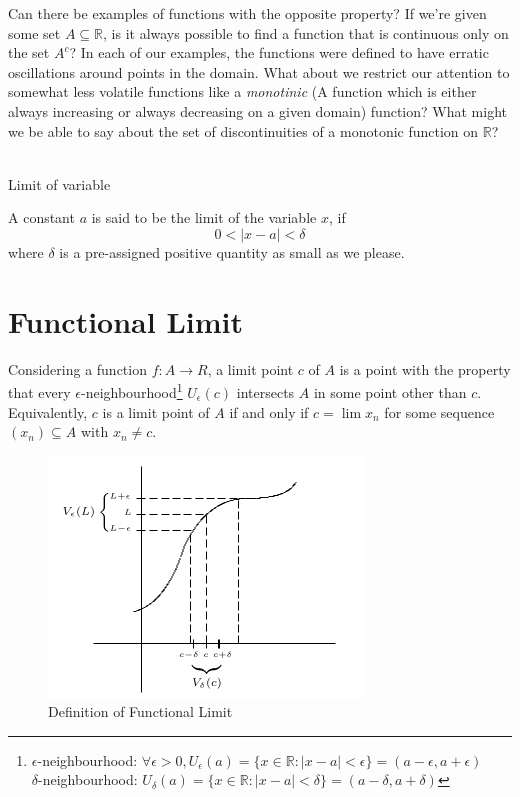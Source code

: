 \documentclass[12pt]{article}
\begin{document}
\quad Can there be examples of functions with the opposite property? If we're given some set $A \subseteq \mathbb{R}$, is it always possible to find a function that is continuous only on the set $A^c$? In each of our examples, the functions were defined to have erratic oscillations around points in the domain. What about we restrict our attention to somewhat less volatile functions like a \textit{monotinic} (A function which is either always increasing or always decreasing on a given domain) function? What might we be able to say about the set of discontinuities of a monotonic function on $\mathbb{R}$? \\~\\

\begin{center}
\end{center}

\begin{definition*}{Limit of variable}

    A constant $a$ is said to be the limit of the variable $x$, if \[
        0 < |x-a| < \delta
    \] where $\delta$ is a pre-assigned positive quantity as small as we please.
\end{definition*}

\section{Functional Limit}
Considering a function $f:A \to R$, a limit point $c$ of $A$ is a point with the property that every $\epsilon$-neighbourhood\footnote{     $\epsilon$-neighbourhood: 
    $ \forall \epsilon > 0, U_\epsilon (a) = \{ x\in\mathbb{R} : |x-a| < \epsilon \} = (a-\epsilon, a+\epsilon)  $ \\
    \quad$\delta$-neighbourhood: $ U_\delta(a) = \{x \in \mathbb{R} : |x-a| < \delta \} = (a-\delta, a+\delta) $
} $U_\epsilon(c)$ intersects $A$ in some point other than $c$. Equivalently, $c$ is a limit point of $A$  if and only if $c=\lim x_n$ for some sequence $(x_n) \subseteq A$ with $x_n \neq c$. \\
\begin{figure}[htpb]
    \centering
    \includegraphics[scale=0.5]{Functional Limit Definition.png}
    \caption{\small Definition of Functional Limit}
\end{figure}
\end{document}
